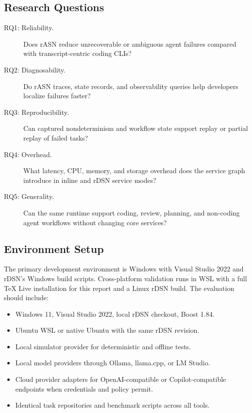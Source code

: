 \documentclass[manuscript,screen,review]{acmart}
\newcommand{\rasn}{rASN\xspace}
\newcommand{\rdsn}{rDSN\xspace}
\begin{document}
\subsection{Research Questions}

\begin{description}
  \item[RQ1: Reliability.] Does \rasn reduce unrecoverable or ambiguous agent
  failures compared with transcript-centric coding CLIs?
  \item[RQ2: Diagnosability.] Do \rasn traces, state records, and observability
  queries help developers localize failures faster?
  \item[RQ3: Reproducibility.] Can captured nondeterminism and workflow state
  support replay or partial replay of failed tasks?
  \item[RQ4: Overhead.] What latency, CPU, memory, and storage overhead does
  the service graph introduce in inline and \rdsn service modes?
  \item[RQ5: Generality.] Can the same runtime support coding, review,
  planning, and non-coding agent workflows without changing core services?
\end{description}

\subsection{Environment Setup}

The primary development environment is Windows with Visual Studio 2022 and
\rdsn's Windows build scripts. Cross-platform validation runs in WSL with a
full TeX Live installation for this report and a Linux \rdsn build. The
evaluation should include:

\begin{itemize}
  \item Windows 11, Visual Studio 2022, local \rdsn checkout, Boost 1.84.
  \item Ubuntu WSL or native Ubuntu with the same \rdsn revision.
  \item Local simulator provider for deterministic and offline tests.
  \item Local model providers through Ollama, llama.cpp, or LM Studio.
  \item Cloud provider adapters for OpenAI-compatible or Copilot-compatible
  endpoints when credentials and policy permit.
  \item Identical task repositories and benchmark scripts across all tools.
\end{itemize}
\end{document}
